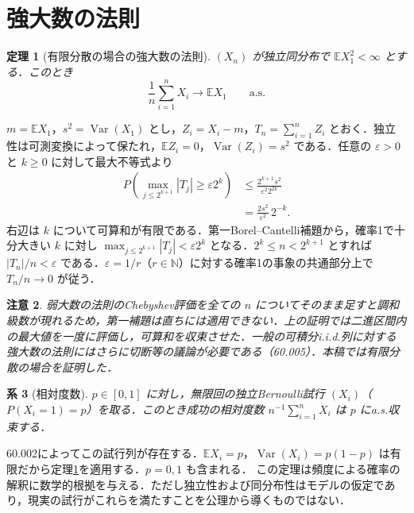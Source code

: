 \documentclass[a5paper,10pt,onecolumn]{jsarticle}
\makeatletter
\theoremstyle{mathnotetheorem}
\newtheorem{theorem}{定理}[section]
\newtheorem{corollary}[theorem]{系}
\newtheorem{remark}[theorem]{注意}
\renewcommand{\proofname}{証明}
\renewenvironment{proof}[1][\proofname]{%
  \par\pushQED{\qed}\normalfont\topsep4\p@\@plus2\p@\relax
  \trivlist\item[\hskip\labelsep\bfseries #1]\ignorespaces
}{\popQED\endtrivlist\@endpefalse}
\newcommand{\N}{\mathbb{N}}
\newcommand{\E}{\mathbb E}
\newcommand{\1}{\mathbf{1}}
\DeclareMathOperator{\Var}{Var}
\makeatother
\begin{document}
\section{強大数の法則}
\begin{theorem}[有限分散の場合の強大数の法則]\label{stronglln}
$(X_n)$ が独立同分布で $\E X_1^2<\infty$ とする．このとき
\[
 \frac1n\sum_{i=1}^nX_i\longrightarrow\E X_1
 \qquad\text{a.s.}
\]
\end{theorem}
\begin{proof}
$m=\E X_1$，$s^2=\Var(X_1)$ とし，$Z_i=X_i-m$，$T_n=\sum_{i=1}^nZ_i$ とおく．独立性は可測変換によって保たれ，$\E Z_i=0$，$\Var(Z_i)=s^2$ である．任意の $\varepsilon>0$ と $k\ge0$ に対して最大不等式より
\begin{align*}
 P\left(\max_{j\le 2^{k+1}}|T_j|\ge\varepsilon2^k\right)
 &\le\frac{2^{k+1}s^2}{\varepsilon^2 2^{2k}}\\
 &=\frac{2s^2}{\varepsilon^2}\,2^{-k}.
\end{align*}
右辺は $k$ について可算和が有限である．第一Borel--Cantelli補題から，確率1で十分大きい $k$ に対し $\max_{j\le2^{k+1}}|T_j|<\varepsilon2^k$ となる．$2^k\le n<2^{k+1}$ とすれば $|T_n|/n<\varepsilon$ である．$\varepsilon=1/r$（$r\in\N$）に対する確率1の事象の共通部分上で $T_n/n\to0$ が従う．
\end{proof}
\begin{remark}
弱大数の法則のChebyshev評価を全ての $n$ についてそのまま足すと調和級数が現れるため，第一補題は直ちには適用できない．上の証明では二進区間内の最大値を一度に評価し，可算和を収束させた．一般の可積分i.i.d.列に対する強大数の法則にはさらに切断等の議論が必要である（60.005）．本稿では有限分散の場合を証明した．
\end{remark}
\begin{corollary}[相対度数]
$p\in[0,1]$ に対し，無限回の独立Bernoulli試行 $(X_i)$（$P(X_i=1)=p$）を取る．このとき成功の相対度数 $n^{-1}\sum_{i=1}^nX_i$ は $p$ にa.s.収束する．
\end{corollary}
\begin{proof}
60.002によってこの試行列が存在する．$\E X_i=p$，$\Var(X_i)=p(1-p)$ は有限だから定理\ref{stronglln}を適用する．$p=0,1$ も含まれる．
\end{proof}
この定理は頻度による確率の解釈に数学的根拠を与える．ただし独立性および同分布性はモデルの仮定であり，現実の試行がこれらを満たすことを公理から導くものではない．
\end{document}
